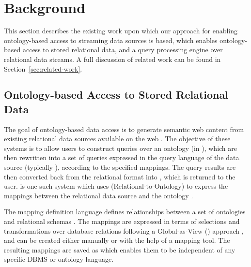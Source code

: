 
\section{Background}
\label{sec:background}

This section describes the existing work upon which our approach for enabling ontology-based access to streaming data sources is based, \viz \rtwoo which enables ontology-based access to stored relational data, and \snee a query processing engine over relational data streams.
A full discussion of related work can be found in Section~\ref{sec:related-work}.


\subsection{Ontology-based Access to Stored Relational Data}
\label{sec:ontol-based-access-stored}

The goal of ontology-based data access is to generate semantic web content from existing relational data sources available on the web \cite{Sahoo_09}.
The objective of these systems is to allow users to construct queries over an ontology (\eg in \sparql), which are then rewritten into a set of queries expressed in the query language of the data source (typically \sql), according to the specified mappings.
The query results are then converted back from the relational format into \rdf, which is returned to the user.
\odemapster is one such system which uses \rtwoo (Relational-to-Ontology) to express the mappings between the relational data source and the ontology \cite{Barrasa_04}.

The mapping definition language \rtwoo defines relationships between a set of ontologies and relational schemas \cite{Barrasa_04}.
The mappings are expressed in terms of selections and transformations over database relations following a Global-as-View (\gav) approach \cite{Lenzerini_02}, and can be created either manually or with the help of a mapping tool.
The resulting mappings are saved as \xml which enables them to be independent of any specific DBMS or ontology language.

